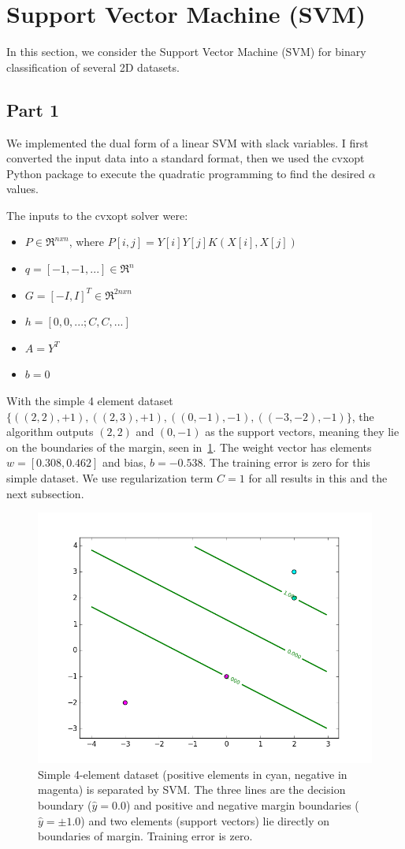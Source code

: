 \section{Support Vector Machine (SVM)} \label{sec:prob2}
In this section, we consider the Support Vector Machine (SVM) for binary classification of several 2D datasets.

\subsection{Part 1}
We implemented the dual form of a linear SVM with slack variables. I first converted the input data into a standard format, then we used the cvxopt Python package to execute the quadratic programming to find the desired $\alpha$ values.

The inputs to the cvxopt solver were:
\begin{itemize}
	\item $P \in \Re^{n x n}$, where $P[i,j] = Y[i]Y[j]K(X[i],X[j])$
	\item $q = [-1, -1, ...] \in \Re^n$
	\item $G = [-I, I]^T \in \Re^{2n x n}$
	\item $h = [0, 0, ...; C, C, ...]$
	\item $A = Y^T$
	\item $b=0$
\end{itemize}

With the simple 4 element dataset $\{((2,2),+1),((2,3),+1),((0,-1),-1),((-3,-2),-1)\}$, the algorithm outputs $(2,2)$ and $(0,-1)$ as the support vectors, meaning they lie on the boundaries of the margin, seen in~\cref{fig:2_1_decisions}.
The weight vector has elements $w = [0.308, 0.462]$ and bias, $b = -0.538$.
The training error is zero for this simple dataset.
We use regularization term $C=1$ for all results in this and the next subsection.

\begin{figure}
	\centering
	\includegraphics [trim=0 0 0 0, clip, angle=0, width=0.8\columnwidth,
	keepaspectratio]{figures/2_1_decisions}
	\caption{Simple 4-element dataset (positive elements in cyan, negative in magenta) is separated by SVM. The three lines are the decision boundary ($\hat{y}=0.0$) and positive and negative margin boundaries ($\hat{y}=\pm1.0$) and two elements (support vectors) lie directly on boundaries of margin. Training error is zero.}
	\label{fig:2_1_decisions} 
\end{figure}

